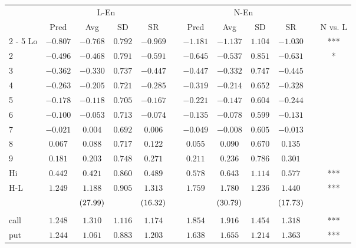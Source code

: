 \begin{tabular}{@{}lccccccccccc@{}}%
\toprule%
&\multicolumn{4}{c}{L{-}En}&&\multicolumn{4}{c}{N{-}En}&&\\%
\multicolumn{1}{c}{}&\multicolumn{1}{c}{Pred}&\multicolumn{1}{c}{Avg}&\multicolumn{1}{c}{SD}&\multicolumn{1}{c}{SR}&\multicolumn{1}{c}{}&\multicolumn{1}{c}{Pred}&\multicolumn{1}{c}{Avg}&\multicolumn{1}{c}{SD}&\multicolumn{1}{c}{SR}&\multicolumn{1}{c}{}&\multicolumn{1}{c}{N vs. L}\\%
\cmidrule{2%
-%
5}%
\cmidrule{7%
-%
10}%
\cmidrule{12%
-%
12}%
Lo&$-0.807$&$-0.768$&$0.792$&$-0.969$&&$-1.181$&$-1.137$&$1.104$&$-1.030$&&***\\%
2&$-0.496$&$-0.468$&$0.791$&$-0.591$&&$-0.645$&$-0.537$&$0.851$&$-0.631$&&*\\%
3&$-0.362$&$-0.330$&$0.737$&$-0.447$&&$-0.447$&$-0.332$&$0.747$&$-0.445$&&\\%
4&$-0.263$&$-0.205$&$0.721$&$-0.285$&&$-0.319$&$-0.214$&$0.652$&$-0.328$&&\\%
5&$-0.178$&$-0.118$&$0.705$&$-0.167$&&$-0.221$&$-0.147$&$0.604$&$-0.244$&&\\%
6&$-0.100$&$-0.053$&$0.713$&$-0.074$&&$-0.135$&$-0.078$&$0.599$&$-0.131$&&\\%
7&$-0.021$&$0.004$&$0.692$&$0.006$&&$-0.049$&$-0.008$&$0.605$&$-0.013$&&\\%
8&$0.067$&$0.088$&$0.717$&$0.122$&&$0.055$&$0.090$&$0.670$&$0.135$&&\\%
9&$0.181$&$0.203$&$0.748$&$0.271$&&$0.211$&$0.236$&$0.786$&$0.301$&&\\%
Hi&$0.442$&$0.421$&$0.860$&$0.489$&&$0.578$&$0.643$&$1.114$&$0.577$&&***\\%
\midrule%
H{-}L&$1.249$&$1.188$&$0.905$&$1.313$&&$1.759$&$1.780$&$1.236$&$1.440$&&***\\%
&&$\footnotesize{(27.99)}$&&$\footnotesize{(16.32)}$&&&$\footnotesize{(30.79)}$&&$\footnotesize{(17.73)}$&&\\%
&&&&&&&&&&&\\%
call&$1.248$&$1.310$&$1.116$&$1.174$&&$1.854$&$1.916$&$1.454$&$1.318$&&***\\%
put&$1.244$&$1.061$&$0.883$&$1.203$&&$1.638$&$1.655$&$1.214$&$1.363$&&***\\\bottomrule%
%
\end{tabular}